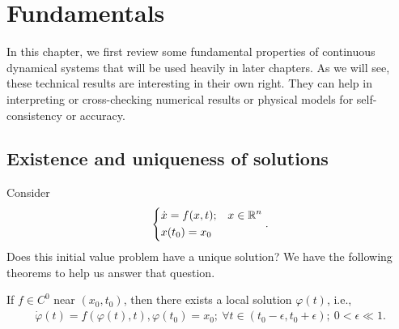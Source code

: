 \chapter{Fundamentals}
 In this chapter, we first review some fundamental properties of continuous dynamical systems that will be used heavily in later chapters. As we will see, these technical results are interesting in their own right. They can help in interpreting or cross-checking numerical results or physical models for self-consistency or accuracy.
\section{Existence and uniqueness of solutions}
Consider  
\begin{align}
\begin{dcases}
	\dot{ {x}} = f( {x},t); &  {x} \in \mathbb{R}^{n} \\
	 {x}(t_0) =  {x}_0
\end{dcases}.
\end{align}
Does this initial value problem have a unique solution? We have the following theorems to help us answer that question.
\begin{theorem}[Peano]
	\label{thm:Peano}
	If $f\in C^0$ near $( {x}_0, t_0)$, then there exists a local solution $\varphi(t)$, i.e., 
\begin{align}
	\dot{\varphi}(t) = f(\varphi(t), t), \varphi(t_0) = x_0;\ \forall  t\in (t_0 - \epsilon, t_0 + \epsilon);\ 0<  \epsilon \ll 1.
\end{align}
\end{theorem}
